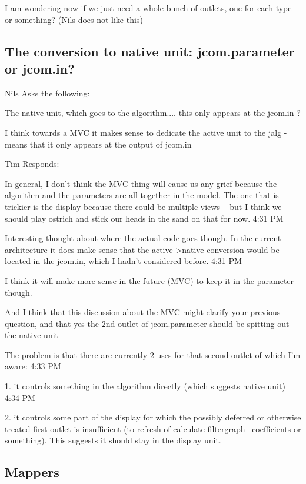 \documentclass[]{article}
\begin{document}
 I am wondering now if we just need a whole bunch of outlets, one for each type or something?  (Nils does not like this)




\subsection{The conversion to native unit: jcom.parameter or jcom.in?}

Nils Asks the following:

The native unit, which goes to the algorithm....  this only appears at the jcom.in ?

I think towards a MVC it makes sense to dedicate the active unit to the jalg - means that it only appears at the output of jcom.in


Tim Responds:

In general, I don't think the MVC thing will cause us any grief because the algorithm and the parameters are all together in the model.  The one that is trickier is the display because there could be multiple views -- but I think we should play ostrich and stick our heads in the sand on that for now.
4:31 PM
 
Interesting thought about where the actual code goes though.  In the current architecture it does make sense that the active->native conversion would be located in the jcom.in, which I hadn't considered before.
4:31 PM
 
I think it will make more sense in the future (MVC) to keep it in the parameter though.

And I think that this discussion about the MVC might clarify your previous question, and that yes the 2nd outlet of jcom.parameter should be spitting out the native unit

The problem is that there are currently 2 uses for that second outlet of which I'm aware:
4:33 PM
 
1. it controls something in the algorithm directly (which suggests native unit)
4:34 PM
 
2. it controls some part of the display for which the possibly deferred or otherwise treated first outlet is insufficient (to refresh of calculate filtergraph~ coefficients or something).  This suggests it should stay in the display unit.


\subsection{Mappers}
\end{document}
